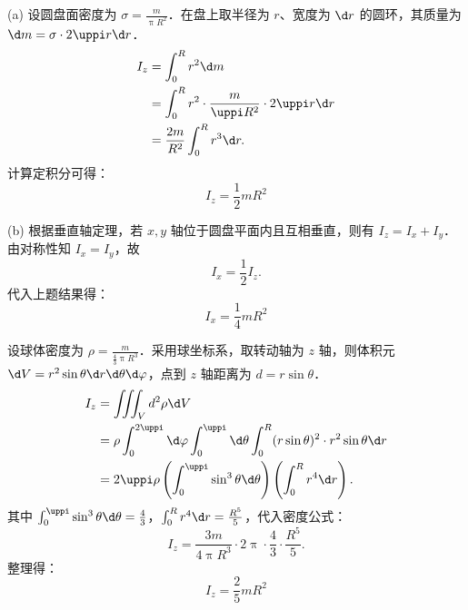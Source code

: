 \begin{solution}

    (a) 设圆盘面密度为 $\sigma = \frac{m}{\uppi R^2}$．在盘上取半径为 $r$、宽度为 $\d r$ 的圆环，其质量为 $\d m = \sigma \cdot 2\uppi r \d r$．
    \begin{equation}
        \label{eq:inertia-disk-z}
        \begin{aligned}
            I_z & = \int_0^R r^2 \d m                                          \\
                & = \int_0^R r^2 \cdot \frac{m}{\uppi R^2} \cdot 2\uppi r \d r \\
                & = \frac{2m}{R^2} \int_0^R r^3 \d r.
        \end{aligned}
    \end{equation}
    计算定积分可得：
    \begin{equation}
        I_z = \boxed{ \frac{1}{2} mR^2 }
    \end{equation}

    (b) 根据垂直轴定理，若 $x, y$ 轴位于圆盘平面内且互相垂直，则有 $I_z = I_x + I_y$．由对称性知 $I_x = I_y$，故
    \begin{equation}
        \label{eq:inertia-disk-x}
        I_x = \frac{1}{2} I_z.
    \end{equation}
    代入上题结果得：
    \begin{equation}
        I_x = \boxed{ \frac{1}{4} mR^2 }
    \end{equation}


    设球体密度为 $\rho = \frac{m}{\frac{4}{3}\uppi R^3}$．采用球坐标系，取转动轴为 $z$ 轴，则体积元 $\d V = r^2 \sin \theta \d r \d \theta \d \varphi$，点到 $z$ 轴距离为 $d = r \sin \theta$．
    \begin{equation}
        \label{eq:inertia-sphere}
        \begin{aligned}
            I_z & = \iiint_V d^2 \rho \d V                                                                                         \\
                & = \rho \int_0^{2\uppi} \d \varphi \int_0^{\uppi} \d \theta \int_0^R (r \sin \theta)^2 \cdot r^2 \sin \theta \d r \\
                & = 2\uppi \rho \left( \int_0^{\uppi} \sin^3 \theta \d \theta \right) \left( \int_0^R r^4 \d r \right).
        \end{aligned}
    \end{equation}
    其中 $\int_0^{\uppi} \sin^3 \theta \d \theta = \frac{4}{3}$，$\int_0^R r^4 \d r = \frac{R^5}{5}$，代入密度公式：
    \begin{equation}
        I_z = \frac{3m}{4\uppi R^3} \cdot 2\uppi \cdot \frac{4}{3} \cdot \frac{R^5}{5}.
    \end{equation}
    整理得：
    \begin{equation}
        I_z = \boxed{ \frac{2}{5} mR^2 }
    \end{equation}
\end{solution}

